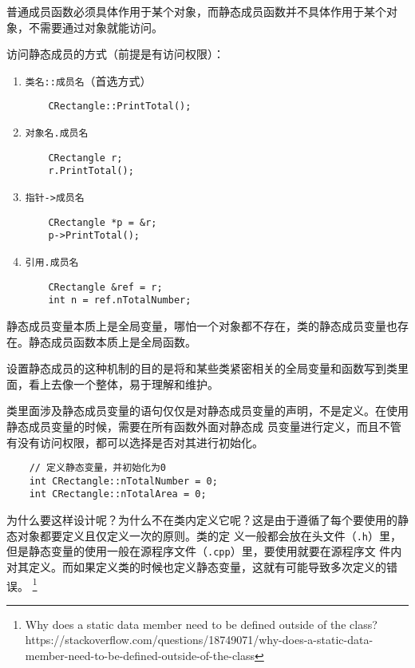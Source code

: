 \documentclass[UTF8]{ctexart}
\begin{document}
普通成员函数必须具体作用于某个对象，而静态成员函数并不具体作用于某个对象，不需要通过对象就能访问。

访问静态成员的方式（前提是有访问权限）：
\begin{enumerate}
    \item \texttt{类名::成员名}（首选方式）
    \begin{verbatim}
    CRectangle::PrintTotal();
    \end{verbatim}
    \item \texttt{对象名.成员名}
    \begin{verbatim}
    CRectangle r;
    r.PrintTotal();
    \end{verbatim}
    \item \texttt{指针->成员名}
    \begin{verbatim}
    CRectangle *p = &r;
    p->PrintTotal();
    \end{verbatim}
    \item \texttt{引用.成员名}
    \begin{verbatim}
    CRectangle &ref = r;
    int n = ref.nTotalNumber;
    \end{verbatim}
\end{enumerate}

静态成员变量本质上是全局变量，哪怕一个对象都不存在，类的静态成员变量也存在。静态成员函数本质上是全局函数。

设置静态成员的这种机制的目的是将和某些类紧密相关的全局变量和函数写到类里面，看上去像一个整体，易于理解和维护。

类里面涉及静态成员变量的语句仅仅是对静态成员变量的声明，不是定义。在使用静态成员变量的时候，需要在所有函数外面对静态成
员变量进行定义，而且不管有没有访问权限，都可以选择是否对其进行初始化。
\begin{verbatim}
    // 定义静态变量，并初始化为0
    int CRectangle::nTotalNumber = 0;
    int CRectangle::nTotalArea = 0;
\end{verbatim}

为什么要这样设计呢？为什么不在类内定义它呢？这是由于遵循了每个要使用的静态对象都要定义且仅定义一次的原则。类的定
义一般都会放在头文件（\texttt{.h}）里，但是静态变量的使用一般在源程序文件（\texttt{.cpp}）里，要使用就要在源程序文
件内对其定义。而如果定义类的时候也定义静态变量，这就有可能导致多次定义的错误。
\footnote{Why does a static data member need to be defined outside of the class?
https://stackoverflow.com/questions/18749071/why-does-a-static-data-member-need-to-be-defined-outside-of-the-class}
\end{document}
